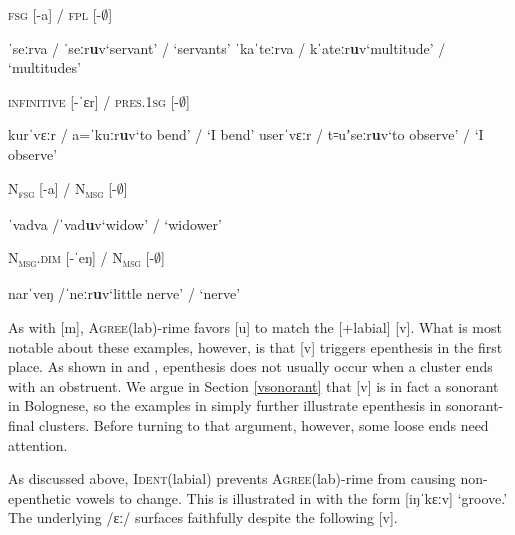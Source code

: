 \documentclass[output=paper,colorlinks,citecolor=brown]{langscibook}
\begin{document}
\begin{exe}
    \ex \label{vepenthesis}
        \begin{xlist}
            \ex \textsc{fsg} [-a] / \textsc{fpl} [-$\emptyset$]
                \begin{xlisti}
                    \ex ˈseːrva / ˈseːr\textbf{u}v\tab `servant' / `servants'
                    \ex ˈkaˈteːrva /  kˈateːr\textbf{u}v\tab `multitude' / `multitudes'
                \end{xlisti}

            \ex \textsc{infinitive} [-ˈɛr] / \textsc{pres.1sg} [-$\emptyset$]
                \begin{xlisti}
                    \ex kurˈvɛːr / a=ˈkuːr\textbf{u}v\tab `to bend' / `I bend'
                    \ex userˈvɛːr / t꞊uʼseːr\textbf{u}v\tab `to observe' / `I observe'
                \end{xlisti}

            \ex \textsc{N\textsubscript{fsg}} [-a] / \textsc{N\textsubscript{msg}} [-$\emptyset$]
                \begin{xlisti}
                    \ex ˈvadva /ˈvad\textbf{u}v\tab `widow' / `widower'
                \end{xlisti}

            \ex \textsc{N\textsubscript{msg}.dim} [-ˈeŋ] / \textsc{N\textsubscript{msg}} [-$\emptyset$]
            \begin{xlisti}
                \ex narˈveŋ /ˈneːr\textbf{u}v\tab `little nerve' / `nerve'
            \end{xlisti}
        \end{xlist}
\end{exe}



As with [m], \textsc{Agree}(lab)-rime favors [u] to match the [+labial] [v].  What is most notable about these examples, however, is that [v] triggers epenthesis in the first place.  As shown in  and , epenthesis does not usually occur when a cluster ends with an obstruent.  We argue in Section \ref{vsonorant} that [v] is in fact a sonorant in Bolognese, so the examples in  simply further illustrate epenthesis in sonorant-final clusters.  Before turning to that argument, however, some loose ends need attention.

As discussed above, \textsc{Ident}(labial) prevents \textsc{Agree}(lab)-rime from causing non-epenthetic vowels to change.  This is illustrated in  with the form [iŋˈkɛːv] `groove.'  The underlying /ɛː/ surfaces faithfully despite the following [v].
\end{document}
